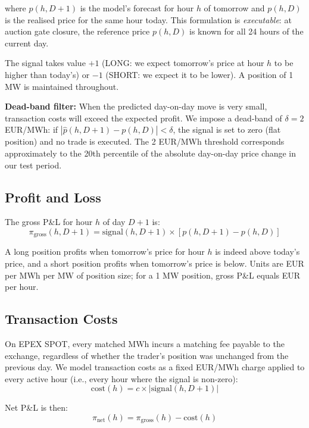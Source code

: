 where $\hat{p}(h, D+1)$ is the model's forecast for hour $h$ of tomorrow and $p(h, D)$ is the realised price for the same hour today. This formulation is \textit{executable}: at auction gate closure, the reference price $p(h, D)$ is known for all 24 hours of the current day.

The signal takes value $+1$ (LONG: we expect tomorrow's price at hour $h$ to be higher than today's) or $-1$ (SHORT: we expect it to be lower). A position of 1 MW is maintained throughout.

\textbf{Dead-band filter:} When the predicted day-on-day move is very small, transaction costs will exceed the expected profit. We impose a dead-band of $\delta = 2$ EUR/MWh: if $|\hat{p}(h, D+1) - p(h, D)| < \delta$, the signal is set to zero (flat position) and no trade is executed. The 2 EUR/MWh threshold corresponds approximately to the 20th percentile of the absolute day-on-day price change in our test period.

\subsection{Profit and Loss}

The gross P\&L for hour $h$ of day $D+1$ is:
\begin{equation}
  \pi_{\text{gross}}(h, D+1) = \text{signal}(h, D+1) \times \left[p(h, D+1) - p(h, D)\right]
  \label{eq:pnl}
\end{equation}

A long position profits when tomorrow's price for hour $h$ is indeed above today's price, and a short position profits when tomorrow's price is below. Units are EUR per MWh per MW of position size; for a 1 MW position, gross P\&L equals EUR per hour.

\subsection{Transaction Costs}

On EPEX SPOT, every matched MWh incurs a matching fee payable to the exchange, regardless of whether the trader's position was unchanged from the previous day. We model transaction costs as a fixed EUR/MWh charge applied to every active hour (i.e., every hour where the signal is non-zero):
\begin{equation}
  \text{cost}(h) = c \times |\text{signal}(h, D+1)|
\end{equation}

Net P\&L is then:
\begin{equation}
  \pi_{\text{net}}(h) = \pi_{\text{gross}}(h) - \text{cost}(h)
\end{equation}


